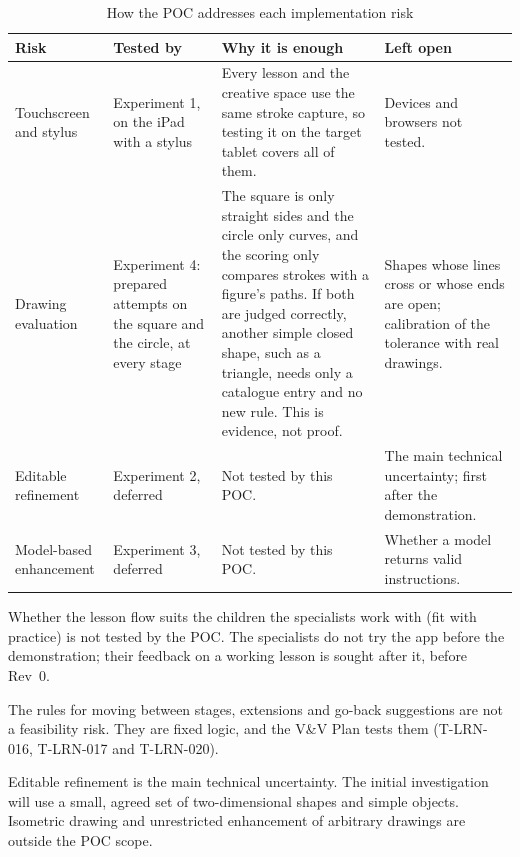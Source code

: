 \documentclass{article}
\begin{document}
\begin{table}[!htbp]
\centering
\caption{How the POC addresses each implementation risk}
\label{tab:poc-risks}
\begin{tabularx}{\textwidth}{@{}>{\raggedright\arraybackslash}p{}>{\raggedright\arraybackslash}p{}Y>{\raggedright\arraybackslash}p{0.2\textwidth}@{}}
\toprule
\textbf{Risk} & \textbf{Tested by} & \textbf{Why it is enough} & \textbf{Left open}\\
\midrule
Touchscreen and stylus & Experiment 1, on the iPad with a stylus & Every
lesson and the creative space use the same stroke capture, so testing it on
the target tablet covers all of them. & Devices and browsers not tested.\\
\addlinespace
Drawing evaluation & Experiment 4: prepared attempts on the square and the
circle, at every stage & The square is only straight sides and the circle only
curves, and the scoring only compares strokes with a figure's paths. If both
are judged correctly, another simple closed shape, such as a triangle, needs
only a catalogue entry and no new rule. This is evidence, not proof. &
Shapes whose lines cross or whose ends are open; calibration of the tolerance
with real drawings.\\
\addlinespace
Editable refinement & Experiment 2, deferred & Not tested by this POC. &
The main technical uncertainty; first after the demonstration.\\
\addlinespace
Model-based enhancement & Experiment 3, deferred & Not tested by this POC. &
Whether a model returns valid instructions.\\
\bottomrule
\end{tabularx}
\end{table}

Whether the lesson flow suits the children the specialists work with
(fit with practice) is not tested by the POC. The specialists do not try the
app before the demonstration; their feedback on a working lesson is sought
after it, before Rev~0.

The rules for moving between stages, extensions and go-back suggestions are
not a feasibility risk. They are fixed logic, and the V\&V Plan tests them
(T-LRN-016, T-LRN-017 and T-LRN-020).

Editable refinement is the main technical uncertainty. The initial
investigation will use a small, agreed set of two-dimensional shapes
and simple objects. Isometric drawing and unrestricted enhancement of
arbitrary drawings are outside the POC scope.
\end{document}
